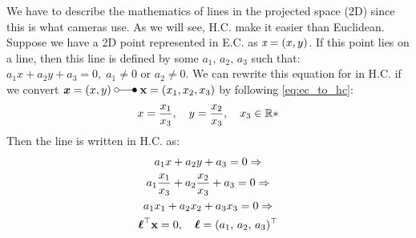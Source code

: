 \documentclass[a4paper]{article}
\begin{document}
We have to describe the mathematics of lines in the projected space (2D) since this is what cameras use. As we will see, H.C. make it easier than Euclidean. Suppose we have a 2D point represented in E.C. as $\textit{\textit{x}} = (x,y)$. If this point lies on a line, then this line is defined by some $a_1,\, a_2,\, a_3$ such that: $a_1x + a_2y + a_3 = 0, \; a_1 \neq 0$ or $a_2\neq 0$. We can rewrite this equation for in H.C. if we convert $\textbf{\textit{x}} = (x,y) \; \laplace \;  \textbf{\textup{x}} = (x_1,x_2,x_3)$ by following \eqref{eq:ec_to_hc}:
\[
x = \frac{x_1}{x_3}, \quad y = \frac{x_2}{x_3}, \quad x_3\in \mathbb{R}*
\]
Then the line is written in H.C. as:
\begin{gather}
    a_1x + a_2y + a_3 = 0 \Rightarrow \nonumber \\
    a_1 \frac{x_1}{x_3} + a_2 \frac{x_2}{x_3} + a_3 = 0 \Rightarrow \nonumber \\
    a_1 x_1 + a_2 x_2 + a_3 x_3 = 0 \Rightarrow \nonumber \\
    \boldsymbol{\ell}^{\top} \textbf{\textup{x}} = 0, \quad \boldsymbol{\ell} = (a_1,\, a_2,\, a_3)^{\top} \nonumber
\end{gather}
\end{document}
